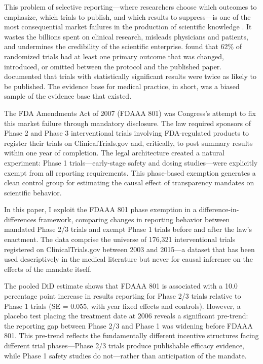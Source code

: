 \documentclass[12pt]{article}
\begin{document}
This problem of selective reporting---where researchers choose which outcomes to emphasize, which trials to publish, and which results to suppress---is one of the most consequential market failures in the production of scientific knowledge \citep{dickersin1990existence, ioannidis2005most}. It wastes the billions spent on clinical research, misleads physicians and patients, and undermines the credibility of the scientific enterprise. \citet{chan2004empirical} found that 62\% of randomized trials had at least one primary outcome that was changed, introduced, or omitted between the protocol and the published paper. \citet{dwan2008systematic} documented that trials with statistically significant results were twice as likely to be published. The evidence base for medical practice, in short, was a biased sample of the evidence base that existed.

The FDA Amendments Act of 2007 (FDAAA 801) was Congress's attempt to fix this market failure through mandatory disclosure. The law required sponsors of Phase 2 and Phase 3 interventional trials involving FDA-regulated products to register their trials on ClinicalTrials.gov and, critically, to post summary results within one year of completion. The legal architecture created a natural experiment: Phase 1 trials---early-stage safety and dosing studies---were explicitly exempt from all reporting requirements. This phase-based exemption generates a clean control group for estimating the causal effect of transparency mandates on scientific behavior.

In this paper, I exploit the FDAAA 801 phase exemption in a difference-in-differences framework, comparing changes in reporting behavior between mandated Phase 2/3 trials and exempt Phase 1 trials before and after the law's enactment. The data comprise the universe of 176,321 interventional trials registered on ClinicalTrials.gov between 2003 and 2015---a dataset that has been used descriptively in the medical literature \citep{califf2012characteristics, anderson2015compliance} but never for causal inference on the effects of the mandate itself.

The pooled DiD estimate shows that FDAAA 801 is associated with a 10.0 percentage point increase in results reporting for Phase 2/3 trials relative to Phase 1 trials (SE = 0.055, with year fixed effects and controls). However, a placebo test placing the treatment date at 2006 reveals a significant pre-trend: the reporting gap between Phase 2/3 and Phase 1 was widening before FDAAA 801. This pre-trend reflects the fundamentally different incentive structures facing different trial phases---Phase 2/3 trials produce publishable efficacy evidence, while Phase 1 safety studies do not---rather than anticipation of the mandate.
\end{document}
